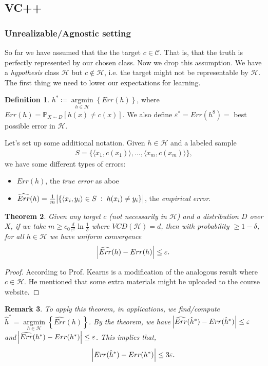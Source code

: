 \documentclass[12pt, letterpaper]{article}
\numberwithin{equation}{section} %
\newcommand{\mb}{\mathbb}
\newcommand{\mc}{\mathcal}
\newcommand{\ve}{\varepsilon}
\newtheorem{theorem}{Theorem}[section]
\newtheorem{remark}[theorem]{Remark}
\theoremstyle{definition}
\newtheorem{definition}[theorem]{Definition}
\theoremstyle{remark}
\begin{document}
\subsection{VC++}
\subsubsection{Unrealizable/Agnostic setting}
So far we have assumed that the the target $c\in\mc C$. That is, that the truth is perfectly represented by our chosen class. Now we drop this assumption. We have a \emph{hypothesis} class $\mc H$ but $c\not\in\mc H$, i.e. the target might not be representable by $\mc H$. The first thing we need to lower our expectations for learning.
\begin{definition}
    $h^*\coloneqq \mathop{argmin}\limits_{h\in\mc H}\left\{Err(h)\right\}$, where $Err(h) = \mb P_{X\sim D}[h(x)\ne c(x)]$. We also define $\ve^* = Err(h^8)=$ best possible error in $\mc H.$
\end{definition}
Let's set up some additional notation. Given $h\in \mc H$ and a labeled sample 
\begin{align}
    S=\lbrace \langle x_1, c(x_1)\rangle,\ldots,\langle x_m, c(x_m)\rangle\rbrace,
\end{align}
we have some different types of errors:
\begin{itemize}
\item $Err(h)$, the \emph{true error} as aboe
\item $\widehat{Err}(h) = \frac1m \abs{\lbrace \langle x_i, y_i\rangle \in S \;:\;h(x_i)\ne y_i\rbrace}$, the \emph{empirical error}.
\end{itemize}

\begin{theorem}
    Given any target $c$ (not necessarily in $\mc H$) and a distribution $D$ over $X$, if we take $m\geq c_0 \frac d{\ve^2}\ln \frac1\delta$ where $VCD(\mc H)=d$, then with probability $\geq 1-\delta$, for all $h\in\mc H$ we have \emph{uniform} convergence
    \begin{align}
        \abs{\widehat{Err}(h)-Err(h)} \leq \ve.
    \end{align}
\end{theorem}
\begin{proof}
    According to Prof. Kearns is a modification of the analogous result where $c\in\mc H$. He mentioned that some extra materials might be uploaded to the course website.
\end{proof}
\begin{remark}
    To apply this theorem, in applications, we find/compute $\hat h^* = \mathop{argmin}\limits_{h\in\mc H}\left\{\widehat{Err}(h)\right\}$. By the theorem, we have
    $ \abs{\widehat{Err}(\hat h^*)-Err(\hat h^*)} \leq \ve$ and  $\abs{\widehat{Err}(h^*)-Err(h^*)} \leq \ve$. This implies that,
    \begin{align}
        \abs{Err(\hat h^*) - Err(h^*)} \leq 3\ve.
    \end{align}
\end{remark}
\end{document}
